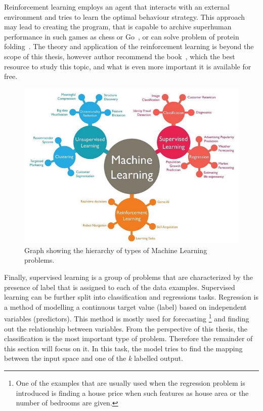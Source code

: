 Reinforcement learning employs an agent that interacts with an external environment and tries to learn the optimal behaviour strategy. This approach may lead to creating the program, that is capable to archive superhuman performance in such games as chess or Go~\cite{alphago}, or can solve problem of protein folding~\cite{alpha_fold}. The theory and application of the reinforcement learning is beyond the scope of this thesis, however author recommend the book~\cite{suton_barto}, which the best resource to study this topic, and what is even more important it is available for free.     

\begin{figure}[h]
\centering
\includegraphics{figures/ML_types.png}
\caption{Graph showing the hierarchy of types of Machine Learning problems. 
\label{fig:ML_types}}
\end{figure}

Finally, supervised learning is a group of problems that are characterized by the presence of label that is assigned to each of the data examples. Supervised learning can be further split into classification and regressions tasks.
 Regression is a method of modelling a continuous target value (label) based on independent variables (predictors). This method is mostly used for forecasting \footnote{One of the examples that are usually used when the regression problem is introduced is finding a house price when such features as house area or the number of bedrooms are given.} and finding out the relationship between variables. 
 From the perspective of this thesis, the classification is the most important type of problem. Therefore the remainder of this section will focus on it.  In this task, the model tries to find the mapping between the input space and one of the \textit{k} labelled output. 
 

